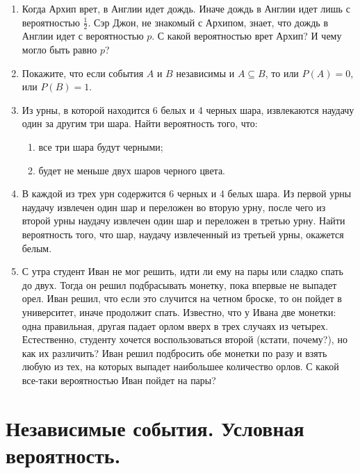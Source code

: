 \documentclass[a4paper, 14pt]{extarticle}
\begin{document}
\begin{enumerate}
\item Когда Архип врет, в Англии идет дождь. Иначе дождь в Англии идет лишь с вероятностью $\frac{1}{2}$. Сэр Джон, не знакомый с Архипом, знает, что дождь в Англии идет с вероятностью $p$. С какой вероятностью врет Архип? И чему могло быть равно $p$?

\item Покажите, что если события $A$ и $B$ независимы и $A\subseteq B$, то или $P(A)=0$, или $P(B)=1$.

\item Из урны, в которой находится 6 белых и 4 черных шара, извлекаются наудачу один за другим три шара. Найти вероятность того, что:
\begin{enumerate}
  \item все три шара будут черными;
  \item будет не меньше двух шаров черного цвета.
\end{enumerate}

\item В каждой из трех урн содержится 6 черных и 4 белых шара. Из первой
урны наудачу извлечен один шар и переложен во вторую урну, после чего из
второй урны наудачу извлечен один шар и переложен в третью урну. Найти
вероятность того, что шар, наудачу извлеченный из третьей урны, окажется
белым.

\item С утра студент Иван не мог решить, идти ли ему на пары или сладко спать до двух. Тогда он решил подбрасывать монетку, пока впервые не выпадет орел. Иван решил, что если это случится на четном броске, то он пойдет в университет, иначе продолжит спать. Известно, что у Ивана две монетки: одна правильная, другая падает орлом вверх в трех случаях из четырех. Естественно, студенту хочется воспользоваться второй (кстати, почему?), но как их различить? Иван решил подбросить обе монетки по разу и взять любую из тех, на которых выпадет наибольшее количество орлов.
С какой все-таки вероятностью Иван пойдет на пары?

\end{enumerate}
\newpage

\section*{Независимые события. Условная вероятность.}
\end{document}
